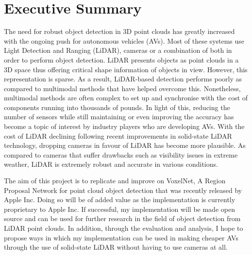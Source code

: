 %
%
%

\chapter*{Executive Summary}
\begin{SingleSpace}
\initial 
{T}he need for robust object detection in 3D point clouds has greatly increased with the ongoing push for autonomous vehicles (AVs). Most of these systems use Light Detection and Ranging (LiDAR), cameras or a combination of both in order to perform object detection. LiDAR presents objects as point clouds in a 3D space thus offering critical shape information of objects in view. However, this representation is sparse. As a result, LiDAR-based detection performs poorly as compared to multimodal methods that have helped overcome this. Nonetheless, multimodal methods are often complex to set up and synchronise with the cost of components running into thousands of pounds.
In light of this, reducing the number of sensors while still maintaining or even improving the accuracy has become a topic of interest by industry players who are developing AVs.  
With the cost of LiDAR declining following recent improvements in solid-state LiDAR technology, dropping cameras in favour of LiDAR has become more plausible. As compared to cameras that suffer drawbacks such as visibility issues in extreme weather, LiDAR is extremely robust and accurate in various conditions. 

The aim of this project is to replicate and improve on VoxelNet, A Region Proposal Network for point cloud object detection that was recently released by Apple Inc. 
Doing so will be of added value as the implementation is currently proprietary to Apple Inc. If successful, my implementation will be made open source and can be used for further research in the field of object detection from LiDAR point clouds. In addition, through the evaluation and analysis, I hope to propose ways in which my implementation can be used in making cheaper AVs through the use of solid-state LiDAR without having to use cameras at all. 


\end{SingleSpace}
